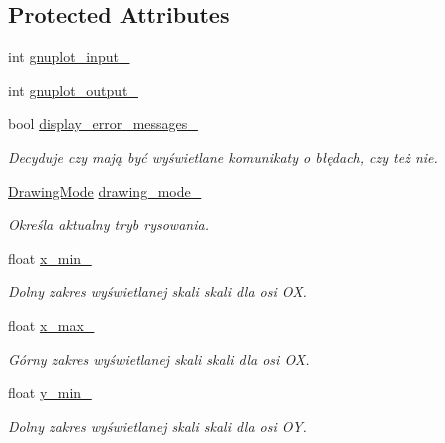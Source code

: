 \subsection*{Protected Attributes}
\begin{DoxyCompactItemize}
\item 
int \hyperlink{class_pz_g_1_1_gnuplot_link_a8b04a557aacb13f62a46bd0cd1233119}{gnuplot\+\_\+input\+\_\+}
\item 
int \hyperlink{class_pz_g_1_1_gnuplot_link_a3ba099cef3e84aab2d3d0f7e99661cca}{gnuplot\+\_\+output\+\_\+}
\item 
bool \hyperlink{class_pz_g_1_1_gnuplot_link_adefdb7c360e54c586b1d6bd1fa5c6eee}{display\+\_\+error\+\_\+messages\+\_\+}
\begin{DoxyCompactList}\small\item\em Decyduje czy mają być wyświetlane komunikaty o błędach, czy też nie. \end{DoxyCompactList}\item 
\hyperlink{namespace_pz_g_a4360c76a1dbf714a19a0d97fe56e0660}{Drawing\+Mode} \hyperlink{class_pz_g_1_1_gnuplot_link_afe3cae0470049aee3c7350f488a630b6}{drawing\+\_\+mode\+\_\+}
\begin{DoxyCompactList}\small\item\em Określa aktualny tryb rysowania. \end{DoxyCompactList}\item 
float \hyperlink{class_pz_g_1_1_gnuplot_link_a9ca081e311914fb07ee4c292b8090247}{x\+\_\+min\+\_\+}
\begin{DoxyCompactList}\small\item\em Dolny zakres wyświetlanej skali skali dla osi {\itshape OX}. \end{DoxyCompactList}\item 
float \hyperlink{class_pz_g_1_1_gnuplot_link_a1f8870f0cc643c5ef931b30b40b5e282}{x\+\_\+max\+\_\+}
\begin{DoxyCompactList}\small\item\em Górny zakres wyświetlanej skali skali dla osi {\itshape OX}. \end{DoxyCompactList}\item 
float \hyperlink{class_pz_g_1_1_gnuplot_link_a31c8d2fcb350d54d09134c0f0a838aea}{y\+\_\+min\+\_\+}
\begin{DoxyCompactList}\small\item\em Dolny zakres wyświetlanej skali skali dla osi {\itshape OY}. \end{DoxyCompactList}\item 

\end{DoxyCompactItemize}
